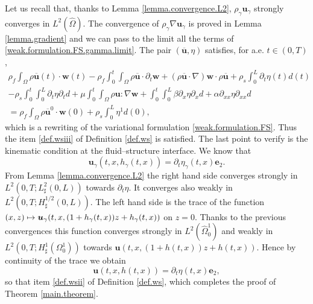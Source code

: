 \documentclass[JEP,XML,SOM,Unicode,NoFloatCountersInSection]{cedram}
\newcommand\mto{\mathchoice{\longmapsto}{\mapsto}{\mapsto}{\mapsto}}
\theoremstyle{remark}
\theoremstyle{definition}
\newcommand{\ug}{\boldsymbol{u}}
\newcommand{\wg}{\boldsymbol{w}}
\newcommand{\BS}[1]{\boldsymbol{#1}}
\let\CM\Omega
\begin{document}
Let us recall that, thanks to Lemma \ref{lemma.convergence.L2}, $\rho_\gamma \ug_{\gamma}$ strongly converges in $L^2(\hat\Omega)$. The convergence of $\rho_{\gamma} \nabla\ug_{\gamma}$ is proved in Lemma \ref{lemma.gradient} and we can pass to the limit all the terms of \eqref{weak.formulation.FS.gamma.limit}. The pair $(\overline{\ug},\eta)$ satisfies, for a.e. $t\in(0,T)$,
\begin{multline*}
\rho_{f}\int_{\CM}\rho\overline{\ug}(t)\cdot\wg(t) -\rho_{f}\int_{0}^{t}\int_{\CM}\rho\overline{\ug}\cdot\partial_{t}\wg + (\rho\overline{\ug}\cdot\nabla)\wg\cdot\rho\overline{\ug}+\rho_{s}\int_{0}^{L}\partial_{t}\eta(t)d(t)\\
-\rho_{s}\int_{0}^{t}\int_{0}^{L}\partial_{t}\eta\partial_{t}d+\mu\int_{0}^{t}\int_{\CM}\rho \ug:\nabla\wg
+\int_{0}^{t}\int_{0}^{L}\beta\partial_{x}\eta\partial_{x}d + \alpha\partial_{xx}\eta\partial_{xx}d\\
=\rho_{f}\int_{\CM}\rho\overline{\ug}^{0}\cdot\wg(0)+\rho_{s}\int_{0}^{L}\eta^{1}d(0),
\end{multline*}
which is a rewriting of the variational formulation \eqref{weak.formulation.FS}. Thus the item \eqref{def.wsiii} of Definition \ref{def.ws} is satisfied.
The last point to verify is the kinematic condition at the fluid--structure interface. We know that
\[
\ug_\gamma(t, x, h_\gamma(t, x))= \partial_t \eta_\gamma(t, x) \BS{e}_2.
\]
From Lemma \ref{lemma.convergence.L2} the right hand side converges strongly in $L^2(0, T; L_\sharp^2(0, L))$ towards $\partial_t \eta$. It converges also weakly in $L^2(0, T; H_\sharp^{1/2}(0, L))$. The left hand side is the trace of the function $(x, z) \mto \ug_\gamma(t, x, (1+h_\gamma(t, x))z + h_\gamma(t, x))$ on $z=0$. Thanks to the previous convergences this function converges strongly in $L^2(\widehat{\Omega}_0^1)$ and weakly in $L^2(0, T; H^1_\sharp(\Omega_0^1))$ towards $\ug(t, x, (1+h(t, x))z + h(t, x))$. Hence by continuity of the trace we obtain
\[
\ug(t, x, h(t, x))= \partial_t \eta(t, x) \BS{e}_2,
\]
so that item \eqref{def.wsii} of Definition \ref{def.ws}, which completes the proof of Theorem \ref{main.theorem}.
\end{document}
